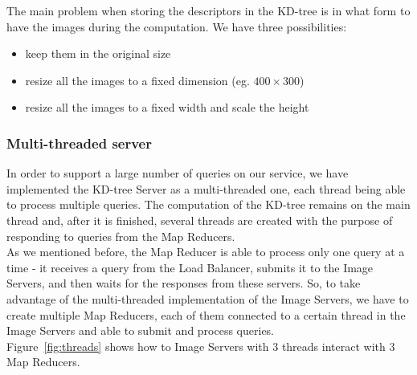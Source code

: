 The main problem when storing the descriptors in the KD-tree is in what form to have the images during the computation. We have three possibilities:
\begin{itemize}
 	\item keep them in the original size
	\item resize all the images to a fixed dimension (eg. $400\times300$)
	\item resize all the images to a fixed width and scale the height
\end{itemize}

\subsubsection{Multi-threaded server}
	In order to support a large number of queries on our service, we have implemented the KD-tree Server as a multi-threaded one, each thread being able to process multiple queries.
	The computation of the KD-tree remains on the main thread and, after it is finished, several threads are created with the purpose of responding to queries from the Map Reducers.\\
	As we mentioned before, the Map Reducer is able to process only one query at a time - it receives a query from the Load Balancer, submits it to the Image Servers, and then waits for the responses from these servers.
	So, to take advantage of the multi-threaded implementation of the Image Servers, we have to create multiple Map Reducers, each of them connected to a certain thread in the Image Servers and able to submit and process queries.\\
	Figure~\ref{fig:threads} shows how to Image Servers with 3 threads interact with 3 Map Reducers.\\

